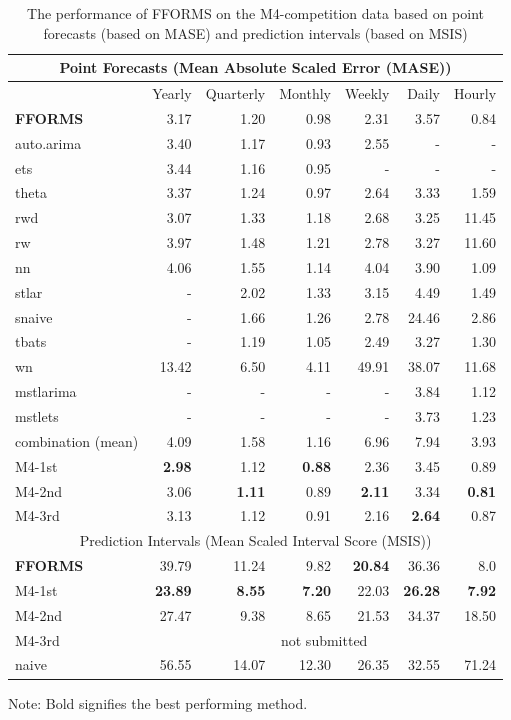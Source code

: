 \documentclass[11pt,a4paper,]{article}
\begin{document}
\begin{table}[!h]
\centering\scriptsize\tabcolsep=0.12cm
\begin{threeparttable}
\caption{The performance of FFORMS on the M4-competition data based on point forecasts (based on MASE) and prediction intervals (based on MSIS)}
\label{forecasts}
\begin{tabular}{lrrrrrr}
\toprule
\multicolumn{7}{c}{Point Forecasts (Mean Absolute Scaled Error (MASE))} \\
\midrule
 & Yearly & Quarterly & Monthly & Weekly & Daily & Hourly \\
\midrule
\bf{FFORMS} & 3.17 &  1.20 &  0.98&  2.31& 3.57 &  0.84\\
auto.arima & 3.40 &1.17  &0.93  & 2.55 &  -& - \\
ets & 3.44 &  1.16& 0.95 &  -&-  &  -\\
theta & 3.37 &1.24  & 0.97 &2.64  & 3.33 & 1.59 \\
rwd & 3.07 & 1.33 & 1.18  & 2.68  & 3.25 & 11.45 \\
rw & 3.97 & 1.48 & 1.21  &2.78  & 3.27 & 11.60 \\
nn & 4.06 & 1.55 &  1.14 &4.04 & 3.90 & 1.09 \\
stlar & - & 2.02 &  1.33& 3.15 & 4.49 & 1.49 \\
snaive & - &  1.66& 1.26 &  2.78& 24.46 & 2.86 \\
tbats & - & 1.19 &  1.05& 2.49 & 3.27 &  1.30\\
wn & 13.42 &  6.50&  4.11&  49.91& 38.07 & 11.68 \\
mstlarima & - & - &  - & - & 3.84 &  1.12\\
mstlets & - &  - &  - &  - & 3.73 &  1.23\\
combination (mean) & 4.09 & 1.58 &  1.16&6.96  & 7.94 & 3.93 \\
\midrule
M4-1st & \bf{2.98} & 1.12 &  \bf{0.88}& 2.36 & 3.45 & 0.89\\
M4-2nd & 3.06 & \bf{1.11} &  0.89& \bf{2.11} & 3.34 & \bf{0.81}\\
M4-3rd & 3.13 & 1.12 &  0.91& 2.16 & \bf{2.64} & 0.87\\
\midrule
\multicolumn{7}{c}{Prediction Intervals (Mean Scaled Interval Score (MSIS))} \\
\midrule
\bf{FFORMS} & 39.79 &  11.24 &  9.82&  \bf{20.84}& 36.36 & 8.0 \\
M4-1st & \bf{23.89} & \bf{8.55} &  \bf{7.20} & 22.03 & \bf{26.28} & \bf{7.92}\\
M4-2nd & 27.47 & 9.38 &  8.65& 21.53 & 34.37 & 18.50\\
M4-3rd & \multicolumn{6}{c}{not submitted}\\
naive & 56.55 & 14.07 &  12.30 & 26.35 & 32.55 & 71.24\\
\bottomrule
\end{tabular}
  \begin{tablenotes}
      \scriptsize
      \item Note: Bold signifies the best performing method.
    \end{tablenotes}
  \end{threeparttable}
\end{table}
\end{document}
